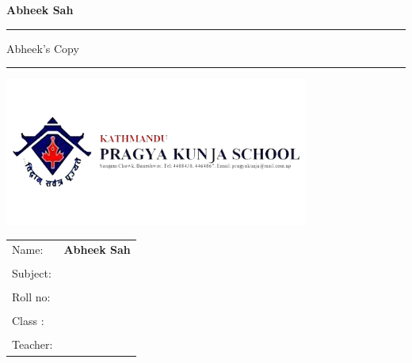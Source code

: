 \documentclass[12pt]{article}
\begin{document}



\begin{titlepage}

    \begin{center}
    \Huge{\textbf{Abheek Sah }}\\
    
    \vspace{10mm}%
    
    \hrule
    \vspace{10mm}
    \Large{Abheek's Copy}\\
    \vspace{10mm} 
    \hrule
    \vspace{10mm}
    \vspace{2cm}
    \includegraphics[width=10cm]{logo.png}
    \vspace{1cm}
    \end{center}
    \vspace{1cm}
    \begin{center}
    \begin{tabular}{ll} %
    \large{Name:}		& \textbf{\large{Abheek Sah}} \\ 
                             \\
    \large{Subject:}	&  \\
    \vspace{0cm}\\
    \large{Roll no:}  & \\
    \vspace{0cm}\\
    \large{Class :}	&  \\
    \vspace{0cm}\\
    \large{Teacher:}		& 
    \end{tabular}
    \end{center}
    \vspace{1cm}
    \hspace{6cm}
    \end{titlepage}
\end{document}
